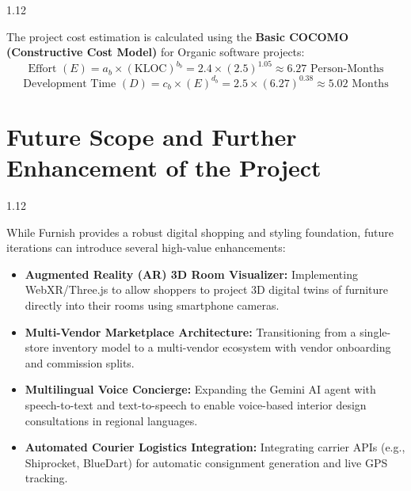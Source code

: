 \documentclass[12pt,a4paper]{article}
\begin{document}
\vspace{0.06in}

{\fontsize{12.5}{17}\selectfont
\begin{spacing}{1.12}

\noindent
The project cost estimation is calculated using the \textbf{Basic COCOMO (Constructive Cost Model)} for Organic software projects:
\begin{equation*}
\text{Effort } (E) = a_b \times (\text{KLOC})^{b_b} = 2.4 \times (2.5)^{1.05} \approx 6.27 \text{ Person-Months}
\end{equation*}
\begin{equation*}
\text{Development Time } (D) = c_b \times (E)^{d_b} = 2.5 \times (6.27)^{0.38} \approx 5.02 \text{ Months}
\end{equation*}

\end{spacing}
}

\vspace{0.10in}






\section{Future Scope and Further Enhancement of the Project}

\vspace{0.06in}

{\fontsize{12.5}{17}\selectfont
\begin{spacing}{1.12}

\noindent
While Furnish provides a robust digital shopping and styling foundation, future iterations can introduce several high-value enhancements:
\begin{itemize}
    \setlength{\itemsep}{2pt}
    \item \textbf{Augmented Reality (AR) 3D Room Visualizer:} Implementing WebXR/Three.js to allow shoppers to project 3D digital twins of furniture directly into their rooms using smartphone cameras.
    \item \textbf{Multi-Vendor Marketplace Architecture:} Transitioning from a single-store inventory model to a multi-vendor ecosystem with vendor onboarding and commission splits.
    \item \textbf{Multilingual Voice Concierge:} Expanding the Gemini AI agent with speech-to-text and text-to-speech to enable voice-based interior design consultations in regional languages.
    \item \textbf{Automated Courier Logistics Integration:} Integrating carrier APIs (e.g., Shiprocket, BlueDart) for automatic consignment generation and live GPS tracking.
\end{itemize}

\end{spacing}
}
\end{document}
